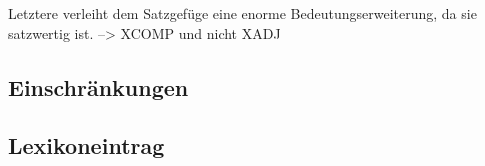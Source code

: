 \documentclass[12pt,a4paper]{article}
\begin{document}
Letztere verleiht dem Satzgefüge eine enorme Bedeutungserweiterung, da sie satzwertig ist. --> XCOMP und nicht XADJ

\subsection{Einschränkungen}

	

\subsection{Lexikoneintrag}
\end{document}
